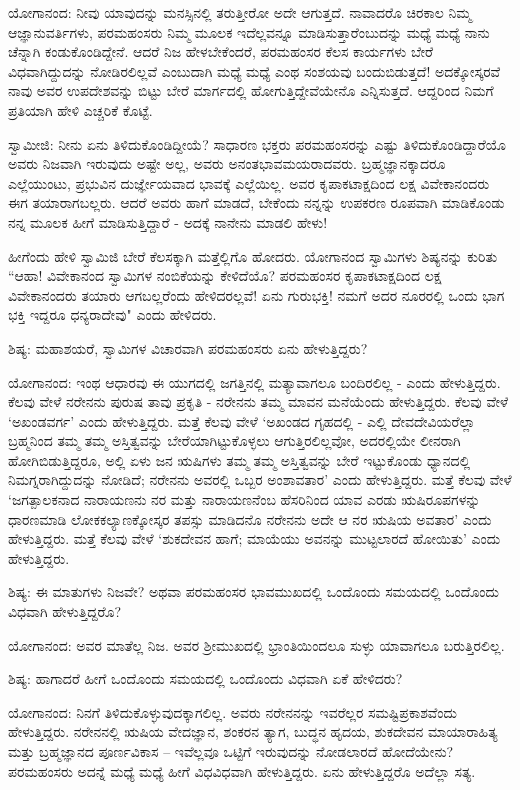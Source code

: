ಯೋಗಾನಂದ: ನೀವು ಯಾವುದನ್ನು ಮನಸ್ಸಿನಲ್ಲಿ ತರುತ್ತೀರೋ ಅದೇ ಆಗುತ್ತದೆ. ನಾವಾದರೊ ಚಿರಕಾಲ ನಿಮ್ಮ ಆಜ್ಞಾನುವರ್ತಿಗಳು, ಪರಮಹಂಸರು ನಿಮ್ಮ ಮೂಲಕ ಇದೆಲ್ಲವನ್ನೂ ಮಾಡಿಸುತ್ತಾರೆಂಬುದನ್ನು ಮಧ್ಯೆ ಮಧ್ಯೆ ನಾನು ಚೆನ್ನಾಗಿ ಕಂಡುಕೊಂಡಿದ್ದೇನೆ. ಆದರೆ ನಿಜ ಹೇಳಬೇಕೆಂದರೆ, ಪರಮಹಂಸರ ಕೆಲಸ ಕಾರ್ಯಗಳು ಬೇರೆ ವಿಧವಾಗಿದ್ದುದನ್ನು ನೋಡಿರಲಿಲ್ಲವೆ ಎಂಬುದಾಗಿ ಮಧ್ಯೆ ಮಧ್ಯೆ ಎಂಥ ಸಂಶಯವು ಬಂದುಬಿಡುತ್ತದೆ! ಅದಕ್ಕೋಸ್ಕರವೆ ನಾವು ಅವರ ಉಪದೇಶವನ್ನು ಬಿಟ್ಟು ಬೇರೆ ಮಾರ್ಗದಲ್ಲಿ ಹೋಗುತ್ತಿದ್ದೇವೆಯೇನೊ ಎನ್ನಿಸುತ್ತದೆ. ಆದ್ದರಿಂದ ನಿಮಗೆ ಪ್ರತಿಯಾಗಿ ಹೇಳಿ ಎಚ್ಚರಿಕೆ ಕೊಟ್ಟೆ.

ಸ್ವಾಮೀಜಿ: ನೀನು ಏನು ತಿಳಿದುಕೊಂಡಿದ್ದೀಯೆ? ಸಾಧಾರಣ ಭಕ್ತರು ಪರಮಹಂಸರನ್ನು ಎಷ್ಟು ತಿಳಿದುಕೊಂಡಿದ್ದಾರೆಯೊ ಅವರು ನಿಜವಾಗಿ ಇರುವುದು ಅಷ್ಟೇ ಅಲ್ಲ, ಅವರು ಅನಂತಭಾವಮಯರಾದವರು. ಬ್ರಹ್ಮಜ್ಞಾನಕ್ಕಾದರೂ ಎಲ್ಲೆಯುಂಟು, ಪ್ರಭುವಿನ ದುರ್ಜ್ಞೇಯವಾದ ಭಾವಕ್ಕೆ ಎಲ್ಲೆಯಿಲ್ಲ. ಅವರ ಕೃಪಾಕಟಾಕ್ಷದಿಂದ ಲಕ್ಷ ವಿವೇಕಾನಂದರು ಈಗ ತಯಾರಾಗಬಲ್ಲರು. ಆದರೆ ಅವರು ಹಾಗೆ ಮಾಡದೆ, ಬೇಕೆಂದು ನನ್ನನ್ನು ಉಪಕರಣ ರೂಪವಾಗಿ ಮಾಡಿಕೊಂಡು ನನ್ನ ಮೂಲಕ ಹೀಗೆ ಮಾಡಿಸುತ್ತಿದ್ದಾರೆ - ಅದಕ್ಕೆ ನಾನೇನು ಮಾಡಲಿ ಹೇಳು!

ಹೀಗೆಂದು ಹೇಳಿ ಸ್ವಾಮಿಜಿ ಬೇರೆ ಕೆಲಸಕ್ಕಾಗಿ ಮತ್ತೆಲ್ಲಿಗೊ ಹೋದರು. ಯೋಗಾನಂದ ಸ್ವಾಮಿಗಳು ಶಿಷ್ಯನನ್ನು ಕುರಿತು “ಆಹಾ! ವಿವೇಕಾನಂದ ಸ್ವಾಮಿಗಳ ನಂಬಿಕೆಯನ್ನು ಕೇಳಿದೆಯೊ? ಪರಮಹಂಸರ ಕೃಪಾಕಟಾಕ್ಷದಿಂದ ಲಕ್ಷ ವಿವೇಕಾನಂದರು ತಯಾರು ಆಗಬಲ್ಲರೆಂದು ಹೇಳಿದರಲ್ಲವೆ! ಏನು ಗುರುಭಕ್ತಿ! ನಮಗೆ ಅದರ ನೂರರಲ್ಲಿ ಒಂದು ಭಾಗ ಭಕ್ತಿ ಇದ್ದರೂ ಧನ್ಯರಾದೇವು" ಎಂದು ಹೇಳಿದರು.

ಶಿಷ್ಯ: ಮಹಾಶಯರೆ, ಸ್ವಾಮಿಗಳ ವಿಚಾರವಾಗಿ ಪರಮಹಂಸರು ಏನು ಹೇಳುತ್ತಿದ್ದರು?

ಯೋಗಾನಂದ: ಇಂಥ ಆಧಾರವು ಈ ಯುಗದಲ್ಲಿ ಜಗತ್ತಿನಲ್ಲಿ ಮತ್ಯಾವಾಗಲೂ ಬಂದಿರಲಿಲ್ಲ - ಎಂದು ಹೇಳುತ್ತಿದ್ದರು. ಕೆಲವು ವೇಳೆ ನರೇನನು ಪುರುಷ ತಾವು ಪ್ರಕೃತಿ - ನರೇನನು ತಮ್ಮ ಮಾವನ ಮನೆಯೆಂದು ಹೇಳುತ್ತಿದ್ದರು. ಕೆಲವು ವೇಳೆ ‘ಅಖಂಡವರ್ಗ’ ಎಂದು ಹೇಳುತ್ತಿದ್ದರು. ಮತ್ತೆ ಕೆಲವು ವೇಳೆ ‘ಅಖಂಡದ ಗೃಹದಲ್ಲಿ - ಎಲ್ಲಿ ದೇವದೇವಿಯರೆಲ್ಲಾ ಬ್ರಹ್ಮನಿಂದ ತಮ್ಮ ತಮ್ಮ ಅಸ್ತಿತ್ವವನ್ನು ಬೇರೆಯಾಗಿಟ್ಟುಕೊಳ್ಳಲು ಆಗುತ್ತಿರಲಿಲ್ಲವೋ, ಅದರಲ್ಲಿಯೇ ಲೀನರಾಗಿ ಹೋಗಿಬಿಡುತ್ತಿದ್ದರೂ, ಅಲ್ಲಿ ಏಳು ಜನ ಋಷಿಗಳು ತಮ್ಮ ತಮ್ಮ ಅಸ್ತಿತ್ವವನ್ನು ಬೇರೆ ಇಟ್ಟುಕೊಂಡು ಧ್ಯಾನದಲ್ಲಿ ನಿಮಗ್ನರಾಗಿದ್ದುದನ್ನು ನೋಡಿದೆ; ನರೇನನು ಅವರಲ್ಲಿ ಒಬ್ಬರ ಅಂಶಾವತಾರ’ ಎಂದು ಹೇಳುತ್ತಿದ್ದರು. ಮತ್ತೆ ಕೆಲವು ವೇಳೆ ‘ಜಗತ್ಪಾಲಕನಾದ ನಾರಾಯಣನು ನರ ಮತ್ತು ನಾರಾಯಣನೆಂಬ ಹೆಸರಿನಿಂದ ಯಾವ ಎರಡು ಋಷಿರೂಪಗಳನ್ನು ಧಾರಣಮಾಡಿ ಲೋಕಕಲ್ಯಾಣಕ್ಕೋಸ್ಕರ ತಪಸ್ಸು ಮಾಡಿದನೊ ನರೇನನು ಅದೇ ಆ ನರ ಋಷಿಯ ಅವತಾರ’ ಎಂದು ಹೇಳುತ್ತಿದ್ದರು. ಮತ್ತೆ ಕೆಲವು ವೇಳೆ ‘ಶುಕದೇವನ ಹಾಗೆ; ಮಾಯೆಯು ಅವನನ್ನು ಮುಟ್ಟಲಾರದೆ ಹೋಯಿತು’ ಎಂದು ಹೇಳುತ್ತಿದ್ದರು.

ಶಿಷ್ಯ: ಈ ಮಾತುಗಳು ನಿಜವೇ? ಅಥವಾ ಪರಮಹಂಸರ ಭಾವಮುಖದಲ್ಲಿ ಒಂದೊಂದು ಸಮಯದಲ್ಲಿ ಒಂದೊಂದು ವಿಧವಾಗಿ ಹೇಳುತ್ತಿದ್ದರೊ?

ಯೋಗಾನಂದ: ಅವರ ಮಾತೆಲ್ಲ ನಿಜ. ಅವರ ಶ‍್ರೀಮುಖದಲ್ಲಿ ಭ್ರಾಂತಿಯಿಂದಲೂ ಸುಳ್ಳು ಯಾವಾಗಲೂ ಬರುತ್ತಿರಲಿಲ್ಲ.

ಶಿಷ್ಯ: ಹಾಗಾದರೆ ಹೀಗೆ ಒಂದೊಂದು ಸಮಯದಲ್ಲಿ ಒಂದೊಂದು ವಿಧವಾಗಿ ಏಕೆ ಹೇಳಿದರು?

ಯೋಗಾನಂದ: ನಿನಗೆ ತಿಳಿದುಕೊಳ್ಳುವುದಕ್ಕಾಗಲಿಲ್ಲ. ಅವರು ನರೇನನನ್ನು ಇವರೆಲ್ಲರ ಸಮಷ್ಟಿಪ್ರಕಾಶವೆಂದು ಹೇಳುತ್ತಿದ್ದರು. ನರೇನನಲ್ಲಿ ಋಷಿಯ ವೇದಜ್ಞಾನ, ಶಂಕರನ ತ್ಯಾಗ, ಬುದ್ಧನ ಹೃದಯ, ಶುಕದೇವನ ಮಾಯಾರಾಹಿತ್ಯ ಮತ್ತು ಬ್ರಹ್ಮಜ್ಞಾನದ ಪೂರ್ಣವಿಕಾಸ – ಇವೆಲ್ಲವೂ ಒಟ್ಟಿಗೆ ಇರುವುದನ್ನು ನೋಡಲಾರದೆ ಹೋದೆಯೇನು? ಪರಮಹಂಸರು ಅದನ್ನೆ ಮಧ್ಯೆ ಮಧ್ಯೆ ಹೀಗೆ ವಿಧವಿಧವಾಗಿ ಹೇಳುತ್ತಿದ್ದರು. ಏನು ಹೇಳುತ್ತಿದ್ದರೊ ಅದೆಲ್ಲಾ ಸತ್ಯ.

